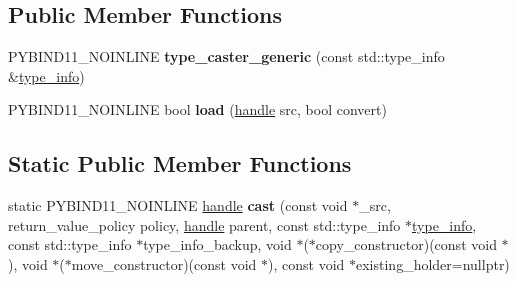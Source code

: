 \subsection*{Public Member Functions}
\begin{DoxyCompactItemize}
\item 
P\+Y\+B\+I\+N\+D11\+\_\+\+N\+O\+I\+N\+L\+I\+NE {\bfseries type\+\_\+caster\+\_\+generic} (const std\+::type\+\_\+info \&\hyperlink{structtype__info}{type\+\_\+info})\hypertarget{classtype__caster__generic_a596f9ddd637dc921c7e19a1a8438f0a8}{}\label{classtype__caster__generic_a596f9ddd637dc921c7e19a1a8438f0a8}

\item 
P\+Y\+B\+I\+N\+D11\+\_\+\+N\+O\+I\+N\+L\+I\+NE bool {\bfseries load} (\hyperlink{classhandle}{handle} src, bool convert)\hypertarget{classtype__caster__generic_a3ab70dd6293541d500d58273ec05c729}{}\label{classtype__caster__generic_a3ab70dd6293541d500d58273ec05c729}

\end{DoxyCompactItemize}
\subsection*{Static Public Member Functions}
\begin{DoxyCompactItemize}
\item 
static P\+Y\+B\+I\+N\+D11\+\_\+\+N\+O\+I\+N\+L\+I\+NE \hyperlink{classhandle}{handle} {\bfseries cast} (const void $\ast$\+\_\+src, return\+\_\+value\+\_\+policy policy, \hyperlink{classhandle}{handle} parent, const std\+::type\+\_\+info $\ast$\hyperlink{structtype__info}{type\+\_\+info}, const std\+::type\+\_\+info $\ast$type\+\_\+info\+\_\+backup, void $\ast$($\ast$copy\+\_\+constructor)(const void $\ast$), void $\ast$($\ast$move\+\_\+constructor)(const void $\ast$), const void $\ast$existing\+\_\+holder=nullptr)\hypertarget{classtype__caster__generic_a99f5a05632cb2a33e4cabe34b29ea6b9}{}\label{classtype__caster__generic_a99f5a05632cb2a33e4cabe34b29ea6b9}

\end{DoxyCompactItemize}
